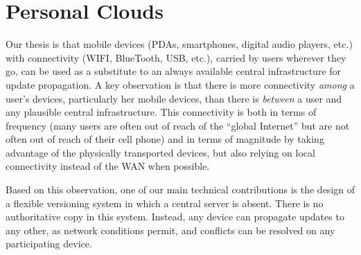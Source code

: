 


\section{Personal Clouds}
\label{sec:model}

Our thesis is that mobile devices (PDAs, smartphones, digital audio
players, etc.) with connectivity (WIFI, BlueTooth, USB, etc.), carried
by users wherever they go, can be used as a substitute to an always
available central infrastructure for update propagation. A key
observation is that there is more connectivity \emph{among} a user's
devices, particularly her mobile devices, than there is \emph{between}
a user and any plausible central infrastructure. This connectivity is
both in terms of frequency (many users are often out of reach of the
``global Internet'' but are not often out of reach of their cell
phone) and in terms of magnitude by taking advantage of the physically
transported devices, but also relying on local connectivity instead
of the WAN when possible.


Based on this observation, one of our main technical contributions is the design of a
flexible versioning system in which a central server is absent.
There is no authoritative copy in this system. 
Instead, any device can propagate updates to any other, as network
conditions permit, and conflicts can be resolved on any participating 
device. 

